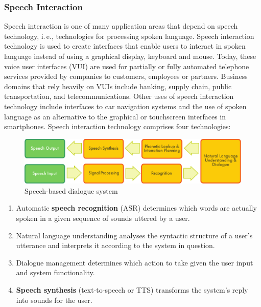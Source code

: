 \documentclass[]{../../metanetpaper}
\begin{document}
\begin{multicols}{2}
\subsubsection{Speech Interaction}

Speech interaction is one of many application areas that depend on speech technology, i.\,e., technologies for processing spoken language. Speech interaction technology is used to create interfaces that enable users to interact in spoken language instead of using a graphical display, keyboard and mouse.  Today, these voice user interfaces (VUI) are used for partially or fully automated telephone services provided by companies to customers, employees or partners. Business domains that rely heavily on VUIs include banking, supply chain, public transportation, and telecommunications. Other uses of speech interaction technology include interfaces to car navigation systems and the use of spoken language as an alternative to the graphical or touchscreen interfaces in smartphones. Speech interaction technology comprises four technologies: 

\begin{figure}[htb]
  \center
  \includegraphics[width=\textwidth]{../_media/english/simple_speech-based_dialogue_architecture}
  \caption{Speech-based dialogue system}
  \label{fig:dialoguearch_en}
\end{figure}

\begin{enumerate}
\item Automatic \textbf{speech recognition} (ASR) determines which words are actually spoken in a given sequence of sounds uttered by a user.  
\item Natural language understanding analyses the syntactic structure of a user’s utterance and interprets it according to the system in question.
\item Dialogue management determines which action to take given the user input and system functionality.   
\item \textbf{Speech synthesis} (text-to-speech or TTS) transforms the system’s reply into sounds for the user.
\end{enumerate}


\end{multicols}
\end{document}
